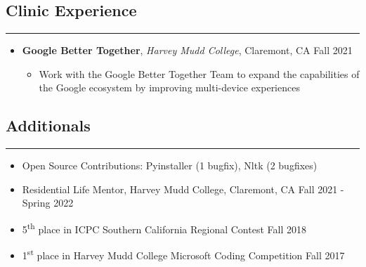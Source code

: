 \documentclass[10pt,letterpaper]{article}
\begin{document}
\subsection*{Clinic Experience}
\vspace{-0.5em}
\hrule
\vspace{1em}
  \begin{itemize}[label={},leftmargin=*]
    \setlength\itemsep{1em}
    \parskip=-0.2em
    \item
    {\textbf{Google Better Together}, \textit{Harvey Mudd College}, Claremont, CA \hfill {Fall 2021}}
    \begin{itemize}[label=\textbullet]
      \itemsep0em
        \item  Work with the Google Better Together Team to expand the capabilities of the Google ecosystem by improving multi-device experiences
    \end{itemize}
  \end{itemize}


\subsection*{Additionals}
\vspace{-0.2em}
\hrule
\vspace{1em}
  \begin{itemize}[label={},leftmargin=*]
    \setlength\itemsep{0.3em}
    \parskip=-0.2em
    \item
    Open Source Contributions: Pyinstaller (1 bugfix), Nltk (2 bugfixes)
    \item
    Residential Life Mentor, Harvey Mudd College, Claremont, CA \hfill Fall 2021 - Spring 2022
    \item
    5\textsuperscript{th} place in ICPC Southern California Regional Contest \hfill Fall 2018
    \item
    1\textsuperscript{st} place in Harvey Mudd College Microsoft Coding Competition \hfill
    Fall 2017
  \end{itemize}
\end{document}
